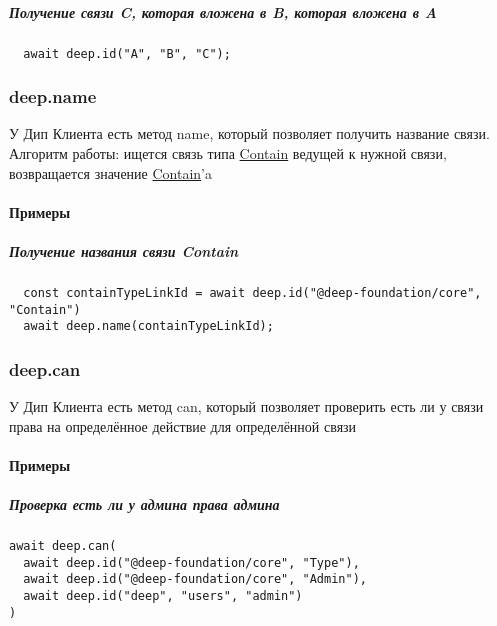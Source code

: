 \subparagraph{Получение связи C, которая вложена в B, которая вложена в A}
\begin{lstlisting}
  await deep.id("A", "B", "C");
\end{lstlisting}
\subsubsection{deep.name}
У Дип Клиента есть метод name, который позволяет получить название связи. \\
Алгоритм работы: ищется связь типа
\hyperlink{Core.Contain.Description}{Contain} ведущей к нужной связи,
возвращается значение \hyperlink{Core.Contain.Description}{Contain}'a
\paragraph{Примеры}
\subparagraph{Получение названия связи Contain}
\begin{lstlisting}
  const containTypeLinkId = await deep.id("@deep-foundation/core", "Contain")
  await deep.name(containTypeLinkId);
\end{lstlisting}
\subsubsection{deep.can}
У Дип Клиента есть метод can, который позволяет проверить есть ли у связи права на определённое действие для определённой связи
\paragraph{Примеры}
\subparagraph{Проверка есть ли у админа права админа}
\begin{lstlisting}
await deep.can(
  await deep.id("@deep-foundation/core", "Type"),
  await deep.id("@deep-foundation/core", "Admin"),
  await deep.id("deep", "users", "admin")
)
\end{lstlisting}